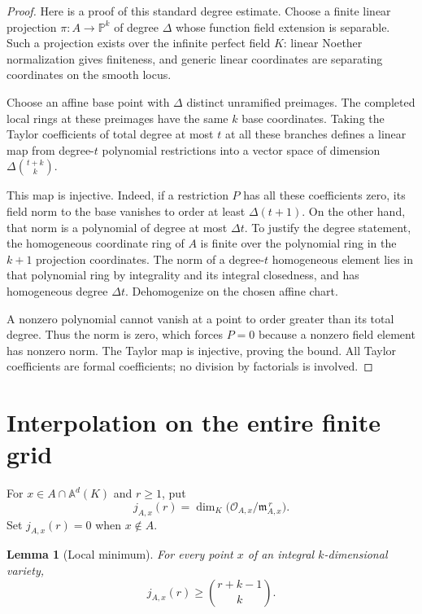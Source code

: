 \documentclass[11pt]{article}
\newcommand{\PP}{\mathbb P}
\newcommand{\A}{\mathbb A}
\newcommand{\cO}{\mathcal O}
\newcommand{\fm}{\mathfrak m}
\newtheorem{lemma}[theorem]{Lemma}
\theoremstyle{remark}
\begin{document}
\begin{proof}
Here is a proof of this standard degree estimate. Choose a finite
linear projection $\pi:A\to\PP^k$ of degree $\Delta$ whose function
field extension is separable. Such a projection exists over the
infinite perfect field $K$: linear Noether normalization gives
finiteness, and generic linear coordinates are separating
coordinates on the smooth locus.

Choose an affine base point with $\Delta$ distinct unramified
preimages. The completed local rings at these preimages have the
same $k$ base coordinates. Taking the Taylor coefficients of total
degree at most $t$ at all these branches defines a linear map
from degree-$t$ polynomial restrictions into a vector space of
dimension $\Delta\binom{t+k}{k}$.

This map is injective. Indeed, if a restriction $P$ has all these
coefficients zero, its field norm to the base vanishes to order at
least $\Delta(t+1)$. On the other hand, that norm is a polynomial
of degree at most $\Delta t$. To justify the degree statement,
the homogeneous coordinate ring of $A$ is finite over the
polynomial ring in the $k+1$ projection coordinates. The norm of
a degree-$t$ homogeneous element lies in that polynomial ring
by integrality and its integral closedness, and has homogeneous
degree $\Delta t$. Dehomogenize on the chosen affine chart.

A nonzero polynomial cannot vanish at a point to order greater
than its total degree. Thus the norm is zero, which forces
$P=0$ because a nonzero field element has nonzero norm.
The Taylor map is injective, proving the bound. All Taylor
coefficients are formal coefficients; no division by factorials
is involved.
\end{proof}

\section{Interpolation on the entire finite grid}

For $x\in A\cap\A^d(K)$ and $r\ge1$, put
\[
 j_{A,x}(r)=\dim_K\bigl(\cO_{A,x}/\fm_{A,x}^{\,r}\bigr).
\]
Set $j_{A,x}(r)=0$ when $x\notin A$.

\begin{lemma}[Local minimum]\label{lem:local}
For every point $x$ of an integral $k$-dimensional variety,
\begin{equation}\label{eq:local-min}
 j_{A,x}(r)\ge\binom{r+k-1}{k}.
\end{equation}
\end{lemma}
\end{document}
